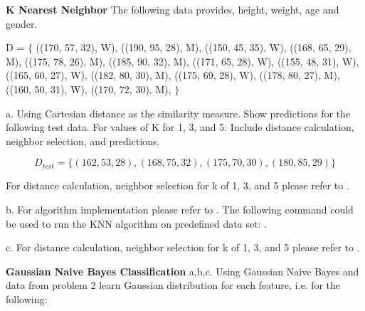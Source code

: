 \documentclass{homeworg}
\begin{document}
\textbf{K Nearest Neighbor}
\newline
The following data provides, height, weight, age and gender.

D = $\{$ \newline
((170, 57, 32), W), \newline
 ((190, 95, 28), M), \newline
 ((150, 45, 35), W), \newline
 ((168, 65, 29), M), \newline
 ((175, 78, 26), M), \newline
 ((185, 90, 32), M), \newline
 ((171, 65, 28), W), \newline
 ((155, 48, 31), W), \newline
 ((165, 60, 27), W), \newline
 ((182, 80, 30), M), \newline
 ((175, 69, 28), W), \newline
 ((178, 80, 27), M), \newline
 ((160, 50, 31), W), \newline
 ((170, 72, 30), M), \newline
$\}$

a. Using Cartesian distance as the similarity measure. Show predictions for the
following test data. For values of K for 1, 3, and 5. Include distance calculation,
neighbor selection, and predictions.

$$
D_{test} = \{(162, 53, 28), (168, 75, 32), (175, 70, 30), (180, 85, 29) \}
$$

For distance calculation, neighbor selection for k of 1, 3, and 5 please refer
to \textbf{}.
\newline

b. For algorithm implementation please refer to \textbf{}.
The following command could be used to run the KNN algorithm on predefined data
set:  \textbf{} \textbf{}.
\newline

c. For distance calculation, neighbor selection for k of 1, 3, and 5 please refer
to \textbf{}.
\newline

\newpage

\exercise*
\textbf{Gaussian Naive Bayes Classification}
\newline
a,b,c. Using Gaussian Naive Bayes and data from problem 2 learn Gaussian distribution
for each feature, i.e. for the following:
\end{document}
